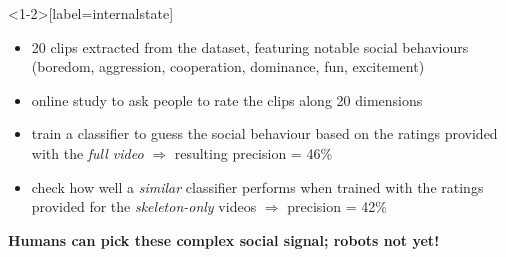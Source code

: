 \documentclass[compress]{beamer}
\makeatletter
\def\beamer@writeslidentry@miniframesoff{%
  \expandafter\beamer@ifempty\expandafter{\beamer@framestartpage}{}%
  {%
    \clearpage\beamer@notesactions%
  }
}
\newcommand*{\miniframesoff}{\let\beamer@writeslidentry=\beamer@writeslidentry@miniframesoff}
\makeatother
\begin{document}
{
\begin{frame}<1-2>[label=internalstate]{}
    \begin{itemize}
        \item<+-> 20 clips extracted from the dataset, featuring notable social
            behaviours (boredom, aggression, cooperation, dominance, fun,
            excitement)
        \item<+-> online study to ask people to rate the clips along 20 dimensions
        \item<+-> train a classifier to guess the social behaviour based on the ratings
            provided with the \emph{full video} $\Rightarrow$ resulting precision = 46\%
        \item<+-> check how well a \emph{similar} classifier performs when trained with the ratings provided for the \emph{skeleton-only} videos $\Rightarrow$ precision = 42\%
    \end{itemize}


    \pause

    {\bf Humans can pick these complex social signal; robots not yet!}

\end{frame}
}




\miniframesoff
\end{document}
